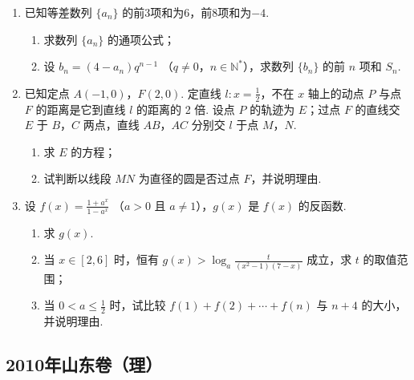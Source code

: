 \begin{description}
\begin{enumerate}[leftmargin=5pt]
        \item 已知等差数列 \(\{a_n\}\) 的前3项和为6，前8项和为\(-4\).

\begin{enumerate}
\item 求数列 \( \{a_n\} \) 的通项公式；
\item 设 \( b_{n} = (4 - a_{n})q^{n - 1} \) （\(q \neq 0\)，\(n \in \mathbb{N}^*\)），求数列 \( \{b_{n}\} \) 的前 \( n \) 项和 \( S_{n} \).
\end{enumerate}

        \item 已知定点 \(A(-1,0)\)，\(F(2,0)\). 定直线 \(l: x = \frac{1}{2}\)，不在 \(x\) 轴上的动点 \(P\) 与点 \(F\) 的距离是它到直线 \(l\) 的距离的 2 倍. 设点 \(P\) 的轨迹为 \(E\)；过点 \(F\) 的直线交 \(E\) 于 \(B\)，\(C\) 两点，直线 \(AB\)，\(AC\) 分别交 \(l\) 于点 \(M\)，\(N\).

\begin{enumerate}
\item 求 \(E\) 的方程；
\item 试判断以线段 \(MN\) 为直径的圆是否过点 \(F\)，并说明理由.
\end{enumerate}

        \item 设 \( f(x) = \frac{1 + a^x}{1 - a^x} \) （\(a > 0\) 且 \(a \neq 1\)），\( g(x) \) 是 \( f(x) \) 的反函数.

\begin{enumerate}
\item 求 \( g(x) \).
\item 当 \(x \in [2,6]\) 时，恒有 \(g(x) > \log_a \frac{t}{(x^2 - 1)(7 - x)}\) 成立，求 \(t\) 的取值范围；
\item 当 \(0 < a \leqslant \frac{1}{2}\) 时，试比较 \(f(1) + f(2) + \cdots + f(n)\) 与 \(n + 4\) 的大小，并说明理由.
\end{enumerate}

    \end{enumerate}

\end{description}


\subsection{2010年山东卷（理）}\label{gk:2010年山东卷（理）}

